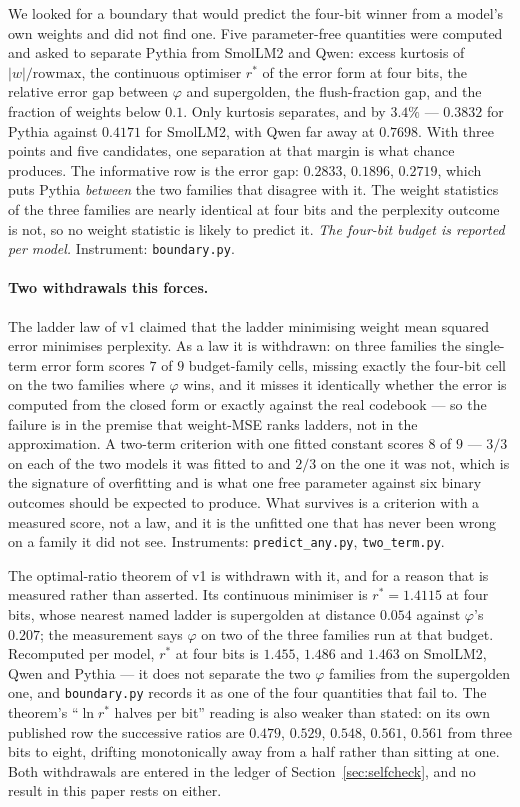 \documentclass[11pt]{article}
\theoremstyle{definition}
\begin{document}
We looked for a boundary that would predict the four-bit winner from a model's
own weights and did not find one. Five parameter-free quantities were computed
and asked to separate Pythia from SmolLM2 and Qwen: excess kurtosis of
$|w|/\mathrm{rowmax}$, the continuous optimiser $r^{*}$ of the error form at four
bits, the relative error gap between $\varphi$ and supergolden, the flush-fraction
gap, and the fraction of weights below $0.1$. Only kurtosis separates, and by
$3.4\%$ --- $0.3832$ for Pythia against $0.4171$ for SmolLM2, with Qwen far away
at $0.7698$. With three points and five candidates, one separation at that
margin is what chance produces. The informative row is the error gap:
$0.2833$, $0.1896$, $0.2719$, which puts Pythia \emph{between} the two families
that disagree with it. The weight statistics of the three families are nearly
identical at four bits and the perplexity outcome is not, so no weight statistic
is likely to predict it. \emph{The four-bit budget is reported per model.}
Instrument: \texttt{boundary.py}.

\paragraph{Two withdrawals this forces.} The ladder law of v1 claimed that the
ladder minimising weight mean squared error minimises perplexity. As a law it is
withdrawn: on three families the single-term error form scores $7$ of $9$
budget-family cells, missing exactly the four-bit cell on the two families where
$\varphi$ wins, and it misses it identically whether the error is computed from
the closed form or exactly against the real codebook --- so the failure is in
the premise that weight-MSE ranks ladders, not in the approximation. A two-term
criterion with one fitted constant scores $8$ of $9$ --- $3/3$ on each of the
two models it was fitted to and $2/3$ on the one it was not, which is the
signature of overfitting and is what one free parameter against six binary
outcomes should be expected to produce. What survives is a criterion with a
measured score, not a law, and it is the unfitted one that has never been wrong
on a family it did not see. Instruments: \texttt{predict\_any.py},
\texttt{two\_term.py}.

The optimal-ratio theorem of v1 is withdrawn with it, and for a reason that is
measured rather than asserted. Its continuous minimiser is $r^{*}=1.4115$ at
four bits, whose nearest named ladder is supergolden at distance $0.054$ against
$\varphi$'s $0.207$; the measurement says $\varphi$ on two of the three families
run at that budget. Recomputed per model, $r^{*}$ at four bits is $1.455$,
$1.486$ and $1.463$ on SmolLM2, Qwen and Pythia --- it does not separate the two
$\varphi$ families from the supergolden one, and \texttt{boundary.py} records it
as one of the four quantities that fail to. The theorem's ``$\ln r^{*}$ halves
per bit'' reading is also weaker than stated: on its own published row the
successive ratios are $0.479$, $0.529$, $0.548$, $0.561$, $0.561$ from three
bits to eight, drifting monotonically away from a half rather than sitting at
one. Both withdrawals are entered in the ledger of Section~\ref{sec:selfcheck},
and no result in this paper rests on either.
\end{document}
